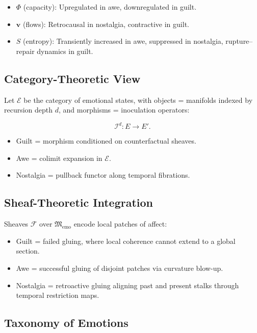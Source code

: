 \documentclass{article}
\theoremstyle{definition}
\begin{document}
\begin{itemize}
  \item $\Phi$ (capacity): Upregulated in awe, downregulated in guilt.  
  \item $\mathbf{v}$ (flows): Retrocausal in nostalgia, contractive in guilt.  
  \item $S$ (entropy): Transiently increased in awe, suppressed in nostalgia, 
        rupture–repair dynamics in guilt.  
\end{itemize}

\subsection{Category-Theoretic View}

Let $\mathcal{E}$ be the category of emotional states, 
with objects = manifolds indexed by recursion depth $d$, 
and morphisms = inoculation operators:

\[
\mathcal{I}^d : E \to E'.
\]

\begin{itemize}
  \item Guilt = morphism conditioned on counterfactual sheaves.  
  \item Awe = colimit expansion in $\mathcal{E}$.  
  \item Nostalgia = pullback functor along temporal fibrations.  
\end{itemize}

\subsection{Sheaf-Theoretic Integration}

Sheaves $\mathcal{F}$ over $\mathfrak{M}_{\text{emo}}$ encode 
local patches of affect:

\begin{itemize}
  \item Guilt = failed gluing, where local coherence cannot extend 
        to a global section.  
  \item Awe = successful gluing of disjoint patches via curvature blow-up.  
  \item Nostalgia = retroactive gluing aligning past and present stalks 
        through temporal restriction maps.  
\end{itemize}

\subsection{Taxonomy of Emotions}
\end{document}
